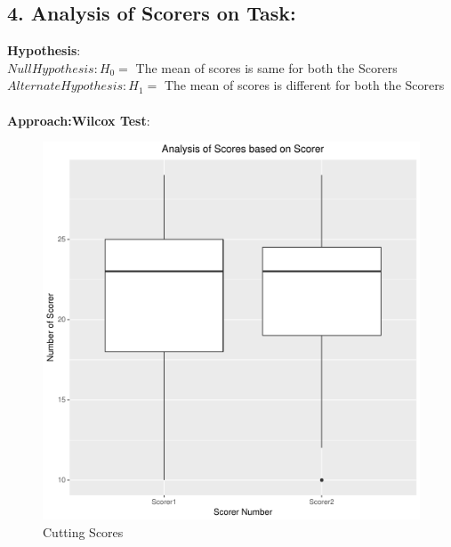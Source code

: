 \documentclass[12pt,epsf]{report}
\begin{document}
\subsection*{4. Analysis of Scorers on Task:}
\textbf{Hypothesis}:\\
$Null Hypothesis : H_0 = $ The mean of scores is same for both the Scorers\\
$Alternate Hypothesis : H_1 = $ The  mean of scores is different for both the Scorers\\
\\
\textbf{Approach:Wilcox Test}:\\
\begin{figure}[!htb]
	\begin{minipage}[c]{0.5\linewidth}
	\includegraphics[width=\linewidth]{Cutting_ScorerVsScore.pdf}
	\caption{ Cutting Scores}
	\end{minipage}
	\hfill
	\begin{minipage}[c]{0.5\linewidth}

\end{minipage}
\end{figure}
\end{document}
